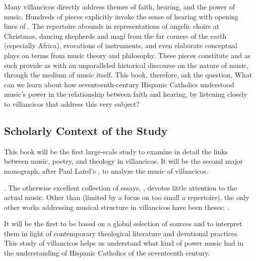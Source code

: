 \documentclass{vcbook-proposal}
\begin{document}
Many villancicos directly address themes of faith, hearing, and the power of music.
Hundreds of pieces explicitly invoke the sense of hearing with opening lines of   .
The repertoire abounds in representations of angelic choirs at Christmas, dancing shepherds and magi from the far corners of the earth (especially Africa), evocations of instruments, and even elaborate conceptual plays on terms from music theory and philosophy.
These pieces constitute  and as such provide as with an unparalleled historical discourse on the nature of music, through the medium of music itself.
This book, therefore, ask the question,
What can we learn about how seventeenth-century Hispanic Catholics understood music's power in the relationship between faith and hearing, by listening closely to villancicos that address this very subject?

\subsection{Scholarly Context of the Study} %

This book will be the first large-scale study to examine in detail the links between music, poetry, and theology in villancicos.
It will be the second major monograph, after Paul Laird's , to analyze the music of villancicos.%
  \begin{Footnote}
  \autocite{Laird:VC}. 
  The otherwise excellent collection of essays, \autocite{Knighton-Torrente:VCs}, devotes little attention to the actual music.
  Other than \autocite{Rubio:Forma} (limited by a focus on too small a repertoire), the only other works addressing musical structure in villancicos have been theses: \autocites{CaberoPueyo:PhD}{Illari:Polychoral}.
  \end{Footnote}
It will be the first to be based on a global selection of sources and to interpret them in light of contemporary theological literature and devotional practices.
This study of villancicos helps us understand what kind of power music had in the understanding of Hispanic Catholics of the seventeenth century.
\end{document}
